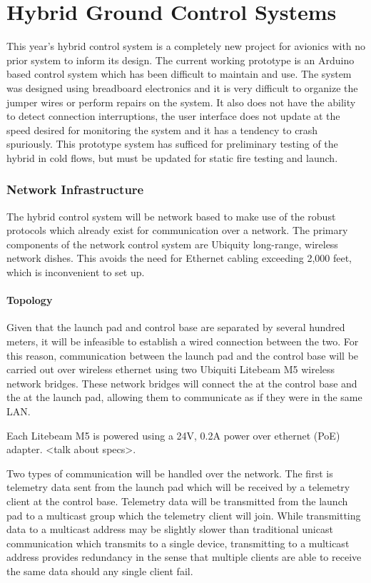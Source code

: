 \part{Hybrid Ground Control Systems}

This year's hybrid control system is a completely new project for avionics with no prior system to inform its design.
The current working prototype is an Arduino based control system which has been difficult to maintain and use. The
system was designed using breadboard electronics and it is very difficult to organize the jumper wires or perform
repairs on the system. It also does not have the ability to detect connection interruptions, the user interface does
not update at the speed desired for monitoring the system and it has a tendency to crash spuriously. This prototype
system has sufficed for preliminary testing of the hybrid in cold flows, but must be updated for static fire testing
and launch.

\section{Network Infrastructure}

The hybrid control system will be network based to make use of the robust protocols which already exist for
communication over a network. The primary components of the network control system are Ubiquity long-range, wireless
network dishes. This avoids the need for Ethernet cabling exceeding 2,000 feet, which is inconvenient to set up.

\subsection{Topology}

Given that the launch pad and control base are separated by several hundred meters, it will be infeasible to establish 
a wired connection between the two. For this reason, communication between the launch pad and the control base will be
carried out over wireless ethernet using two Ubiquiti Litebeam M5 wireless network bridges. These network bridges will connect 
the  at the control base and the  at the launch pad, allowing them to communicate as if they 
were in the same LAN.

Each Litebeam M5 is powered using a 24V, 0.2A power over ethernet (PoE) adapter. <talk about specs>. 

Two types of communication will be handled over the network. The first is telemetry data sent from the launch pad which will be 
received by a telemetry client at the control base. Telemetry data will be transmitted from the launch pad to a 
multicast group which the telemetry client will join. While transmitting data to a  multicast address may be 
slightly slower than traditional  unicast communication which transmits to a single device, transmitting to a 
multicast address provides redundancy in the sense that multiple clients are able to receive the same data should any single client
fail.

